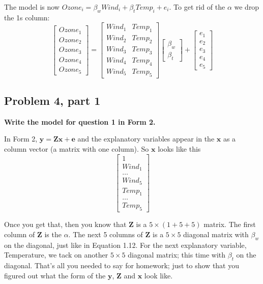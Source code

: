 The model is now $Ozone_i = \beta_w Wind_i + \beta_t Temp_i + e_i$.  To get rid of the $\alpha$ we drop the 1s column: 
$$
\begin{bmatrix} Ozone_1 \\ Ozone_2  \\ Ozone_3 \\ Ozone_4 \\ Ozone_5 \end{bmatrix}=
\begin{bmatrix} Wind_1 & Temp_1\\ Wind_2 & Temp_2 \\ Wind_3 & Temp_3 \\ Wind_4 & Temp_4 \\ Wind_5 & Temp_5 \end{bmatrix}
\begin{bmatrix} \beta_w \\ \beta_t \end{bmatrix} + 
\begin{bmatrix} e_1 \\ e_2 \\ e_3 \\ e_4 \\ e_5 \end{bmatrix}
$$


\subsection*{Problem 4, part 1}
{\bf Write the model for question 1 in Form 2.}

In Form 2, $\mathbf{y}=\mathbf{Z}\mathbf{x}+\mathbf{e}$ and the explanatory variables appear in the $\mathbf{x}$ as a column vector (a matrix with one column). So $\mathbf{x}$ looks like this
$$\begin{bmatrix} 1 \\ Wind_1 \\ \dots \\ Wind_5 \\ Temp_1 \\ \dots \\ Temp_5 \end{bmatrix}$$

Once you get that, then you know that $\mathbf{Z}$ is a $5 \times (1+5+5)$ matrix.  The first column of $\mathbf{Z}$ is the $\alpha$.  The next 5 columns of $\mathbf{Z}$ is a $5 \times 5$ diagonal matrix with $\beta_w$ on the diagonal, just like in Equation 1.12.  For the next explanatory variable, Temperature, we tack on another $5 \times 5$ diagonal matrix; this time with $\beta_t$ on the diagonal.  That's all you needed to say for homework; just to show that you figured out what the form of the $\mathbf{y}$, $\mathbf{Z}$ and $\mathbf{x}$ look like.

